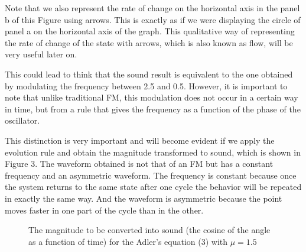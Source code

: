 \documentclass{article}
\begin{document}
Note that we also represent the rate of change on the horizontal axis in the panel b of this Figure using arrows. 
This is exactly as if we were displaying the circle of panel a on the horizontal axis of the graph. 
This qualitative way of representing the rate of change of the state with arrows, which is also known as flow, will be very useful later on.

This could lead to think that the sound result is equivalent to the one obtained by modulating the frequency between 2.5 and 0.5. 
However, it is important to note that unlike traditional FM, this modulation does not occur in a certain way in time, but from a rule that gives the frequency as a function of the phase of the oscillator. 


This distinction is very important and will become evident if we apply the evolution rule and obtain the magnitude transformed to sound, which is shown in Figure 3. 
The waveform obtained is not that of an FM but has a constant frequency and an asymmetric waveform. 
The frequency is constant because once the system returns to the same state after one cycle the behavior will be repeated in exactly the same way. 
And the waveform is asymmetric because the point moves faster in one part of the cycle than in the other.

\begin{figure}[h]
    \centering
    \caption{The magnitude to be converted into sound (the cosine of the angle as a function of time) for the Adler's equation (3) with $\mu=1.5$} 
    \label{adler2}
\end{figure}
\end{document}
